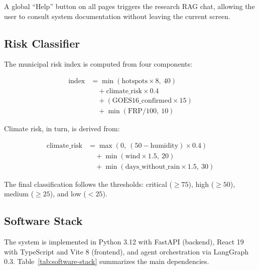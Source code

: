 \documentclass[preprint,12pt,times,numbers]{elsarticle}
\begin{document}
A global ``Help'' button on all pages triggers the research RAG chat, allowing the user to consult system documentation without leaving the current screen.

\subsection{Risk Classifier}
\label{sec:risk}

The municipal risk index is computed from four components:

\begin{align}
\text{index} &= \min(\text{hotspots} \times 8,\ 40) \nonumber \\
               &\quad + \text{climate\_risk} \times 0.4 \nonumber \\
               &\quad + (\text{GOES16\_confirmed} \times 15) \nonumber \\
               &\quad + \min(\text{FRP} / 100,\ 10)
\end{align}

Climate risk, in turn, is derived from:

\begin{align}
\text{climate\_risk} &= \max(0,\ (50 - \text{humidity}) \times 0.4) \nonumber \\
                         &\quad + \min(\text{wind} \times 1.5,\ 20) \nonumber \\
                         &\quad + \min(\text{days\_without\_rain} \times 1.5,\ 30)
\end{align}

The final classification follows the thresholds: critical ($\ge 75$), high ($\ge 50$), medium ($\ge 25$), and low ($< 25$).

\subsection{Software Stack}
\label{sec:software-stack}

The system is implemented in Python 3.12 with FastAPI (backend), React 19 with TypeScript and Vite 8 (frontend), and agent orchestration via LangGraph 0.3. Table~\ref{tab:software-stack} summarizes the main dependencies.
\end{document}
